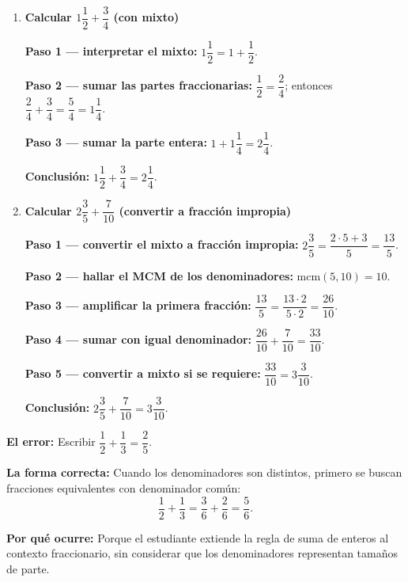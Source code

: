 \documentclass[11pt, letterpaper]{article}
\begin{document}
\begin{tcolorbox}[examplebox, title={Ejemplos --- Suma de fracciones}]
\begin{enumerate}[label=\textbf{Ej. \arabic*.}, leftmargin=*, itemsep=16pt]
\medskip
\textbf{Conclusi\'on:} $\dfrac{5}{12}+\dfrac{3}{8}=\dfrac{19}{24}$.

  \item \textbf{Calcular $1\dfrac{1}{2}+\dfrac{3}{4}$ (con mixto)}

  \textbf{Paso 1 --- interpretar el mixto:}
  $1\dfrac{1}{2}=1+\dfrac{1}{2}$.

  \medskip
  \textbf{Paso 2 --- sumar las partes fraccionarias:}
  $\dfrac{1}{2}=\dfrac{2}{4}$; entonces $\dfrac{2}{4}+\dfrac{3}{4}=\dfrac{5}{4}=1\dfrac{1}{4}$.

  \medskip
  \textbf{Paso 3 --- sumar la parte entera:}
  $1+1\dfrac{1}{4}=2\dfrac{1}{4}$.

  \medskip
  \textbf{Conclusi\'on:} $1\dfrac{1}{2}+\dfrac{3}{4}=2\dfrac{1}{4}$.

  \item \textbf{Calcular $2\dfrac{3}{5}+\dfrac{7}{10}$ (convertir a fracci\'on impropia)}

  \textbf{Paso 1 --- convertir el mixto a fracci\'on impropia:}
  $2\dfrac{3}{5}=\dfrac{2\cdot5+3}{5}=\dfrac{13}{5}$.

  \medskip
  \textbf{Paso 2 --- hallar el MCM de los denominadores:}
  $\text{mcm}(5,10)=10$.

  \medskip
  \textbf{Paso 3 --- amplificar la primera fracci\'on:}
  $\dfrac{13}{5}=\dfrac{13\cdot2}{5\cdot2}=\dfrac{26}{10}$.

  \medskip
  \textbf{Paso 4 --- sumar con igual denominador:}
  $\dfrac{26}{10}+\dfrac{7}{10}=\dfrac{33}{10}$.

  \medskip
  \textbf{Paso 5 --- convertir a mixto si se requiere:}
  $\dfrac{33}{10}=3\dfrac{3}{10}$.

  \medskip
  \textbf{Conclusi\'on:} $2\dfrac{3}{5}+\dfrac{7}{10}=3\dfrac{3}{10}$.

\end{enumerate}
\end{tcolorbox}

\begin{tcolorbox}[warningbox, title={Error frecuente --- Sumar numerador con numerador y denominador con denominador}]
\noindent\textbf{El error:}
Escribir $\dfrac{1}{2}+\dfrac{1}{3}=\dfrac{2}{5}$.

\medskip
\noindent\textbf{La forma correcta:}
Cuando los denominadores son distintos, primero se buscan fracciones equivalentes con denominador com\'un:
$$\frac{1}{2}+\frac{1}{3}=\frac{3}{6}+\frac{2}{6}=\frac{5}{6}.$$

\medskip
\noindent\textbf{Por qu\'e ocurre:}
Porque el estudiante extiende la regla de suma de enteros al contexto fraccionario, sin considerar que los denominadores representan tama\~nos de parte.
\end{tcolorbox}
\end{document}
